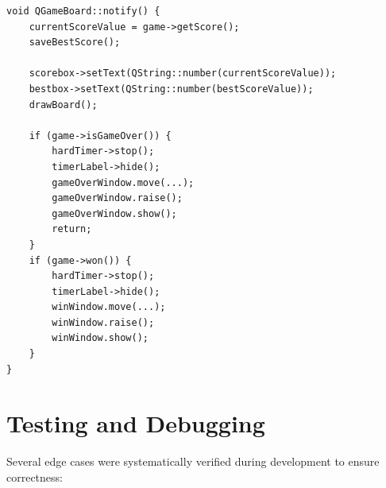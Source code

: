 \documentclass[a4paper,12pt]{article}
\begin{document}
\begin{lstlisting}[style=CppStyle, caption={\texttt{QGameBoard::notify()} --- the Observer callback}]
void QGameBoard::notify() {
    currentScoreValue = game->getScore();
    saveBestScore();

    scorebox->setText(QString::number(currentScoreValue));
    bestbox->setText(QString::number(bestScoreValue));
    drawBoard();

    if (game->isGameOver()) {
        hardTimer->stop();
        timerLabel->hide();
        gameOverWindow.move(...);
        gameOverWindow.raise();
        gameOverWindow.show();
        return;
    }
    if (game->won()) {
        hardTimer->stop();
        timerLabel->hide();
        winWindow.move(...);
        winWindow.raise();
        winWindow.show();
    }
}
\end{lstlisting}

\section{Testing and Debugging}

Several edge cases were systematically verified during development to ensure correctness:
\end{document}
